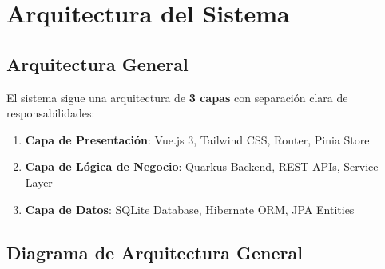 \documentclass[12pt,a4paper]{article}
\begin{document}
\section{Arquitectura del Sistema}

\subsection{Arquitectura General}

El sistema sigue una arquitectura de \textbf{3 capas} con separación clara de responsabilidades:

\begin{enumerate}
    \item \textbf{Capa de Presentación}: Vue.js 3, Tailwind CSS, Router, Pinia Store
    \item \textbf{Capa de Lógica de Negocio}: Quarkus Backend, REST APIs, Service Layer
    \item \textbf{Capa de Datos}: SQLite Database, Hibernate ORM, JPA Entities
\end{enumerate}

\subsection{Diagrama de Arquitectura General}
\end{document}
